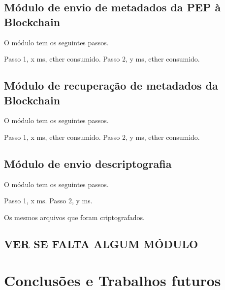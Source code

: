 \documentclass[a4paper,11pt]{article}
\begin{document}
\subsection{Módulo de envio de metadados da PEP à Blockchain}

O módulo tem os seguintes passos.

Passo 1, x ms, ether consumido.
Passo 2, y ms, ether consumido.

\subsection{Módulo de recuperação de metadados da Blockchain}

O módulo tem os seguintes passos.

Passo 1, x ms, ether consumido.
Passo 2, y ms, ether consumido.

\subsection{Módulo de envio descriptografia}

O módulo tem os seguintes passos.

Passo 1, x ms.
Passo 2, y ms.

Os mesmos arquivos que foram criptografados.

\subsection{VER SE FALTA ALGUM MÓDULO}

\newpage
\section{Conclusões e Trabalhos futuros}




\appendix
\end{document}
